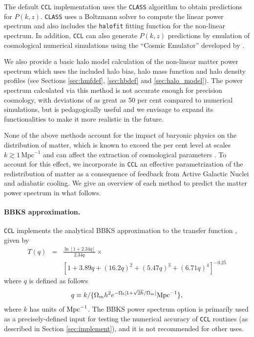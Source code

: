 \documentclass[\docopts]{\docclass}
\newcommand{\ccl}{{\tt CCL}\xspace}
\newcommand{\halofit}{{\tt halofit}\xspace}
\newcommand{\class}{{\tt CLASS}\xspace}
\begin{document}
The default \ccl implementation uses the \class algorithm \citet{class} to obtain predictions for $P(k,z)$. \class uses a Boltzmann solver to compute the linear power spectrum and also includes the \halofit \citep{Smith2003,CLASS_halofit} fitting function for the non-linear spectrum. In addition, \ccl can also generate $P(k,z)$ predictions by emulation of cosmological numerical simulations using the ``Cosmic Emulator'' developed by \citet{Lawrence17}.

We also provide a basic halo model calculation of the non-linear matter power spectrum which uses the included halo bias, halo mass function and halo density profiles (see Sections \ref{sec:hmfdef}, \ref{sec:hbdef} and \ref{sec:halo_model}). The power spectrum calculated via this method is not accurate enough for precision cosmology, with deviations of as great as 50 per cent compared to numerical simulations, but is pedagogically useful and we envisage to expand its functionalities to make it more realistic in the future.

None of the above methods account for the impact of baryonic physics on the distribution of matter, which is known to exceed the per cent level at scales $k \gtrsim 1\,\text{Mpc}^{-1}$ \citep{vanDaalen11,Illustris,Hellwing16,Springel17,Chisari18} and can affect the extraction of cosmological parameters \citep{Semboloni11,Semboloni13,Mohammed14,Eifler15,Mohammed17}. To account for this effect, we incorporate in \ccl an effective parametrization \citep{Schneider15} of the redistribution of matter as a consequence of feedback from Active Galactic Nuclei and adiabatic cooling. We give an overview of each method to predict the matter power spectrum in what follows.

\paragraph{\bf BBKS approximation.} \ccl implements the analytical BBKS approximation to the transfer function \citep{BBKS}, given by
\begin{eqnarray}
  \label{eq:bbks}
  T(q) &=& \frac{\ln[1+2.34q]}{2.34q}\times\\
  &&[1+3.89q+(16.2q)^2+(5.47q)^3+(6.71q)^4]^{-0.25}\nonumber
\end{eqnarray}
where $q$ is defined as follows \citep{Sugiyama95}
\begin{equation}
  q \equiv k/\{\Omega_m h^2 e^{-\Omega_b[1+\sqrt{2h}/\Omega_m]}{\rm Mpc}^{-1}\},
\end{equation}
where $k$ has units of ${\rm Mpc}^{-1}$. The BBKS power spectrum option is primarily used as a precisely-defined input for testing the numerical accuracy of \ccl routines (as described in Section \ref{sec:implement}), and it is not recommended for other uses.
\end{document}

